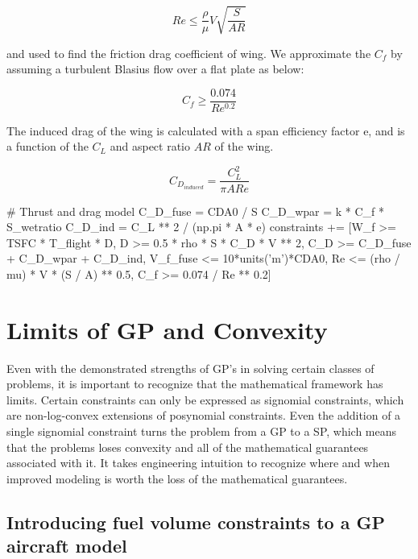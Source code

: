 \begin{equation}
    Re \leq \frac{\rho}{\mu} V \sqrt{\frac{S}{AR}}
\label{e:re}
\end{equation}

and used to find the friction drag coefficient of wing. We approximate the $C_f$ by assuming a turbulent Blasius flow over a flat plate as below:

\begin{equation}
    C_f \geq \frac{0.074} {Re^{0.2}}
\end{equation}

The induced drag of the wing is calculated with a span efficiency factor e, and is a function of the $C_L$ and aspect ratio $AR$ of the wing.

\begin{equation}
    C_{D_{induced}} = \frac{C_L^2}{\pi AR e}
\label{e:cdinduced}
\end{equation}

\begin{python}
        # Thrust and drag model
        C_D_fuse = CDA0 / S
        C_D_wpar = k * C_f * S_wetratio
        C_D_ind  = C_L ** 2 / (np.pi * A * e)
        constraints += [W_f >= TSFC * T_flight * D,
                    D >= 0.5 * rho * S * C_D * V ** 2,
                    C_D >= C_D_fuse + C_D_wpar + C_D_ind,
                    V_f_fuse <= 10*units('m')*CDA0,
                    Re <= (rho / mu) * V * (S / A) ** 0.5,
                    C_f >= 0.074 / Re ** 0.2]
\end{python}


\section{Limits of GP and Convexity} \label{sec:GPLimits}

Even with the demonstrated strengths of \gls{GP}'s in solving certain classes of 
problems, it is important to recognize that the mathematical framework has limits. 
Certain constraints can only be expressed as signomial constraints, which are 
non-log-convex extensions of posynomial constraints. Even the addition of a single 
signomial constraint turns the problem from a \gls{GP} to a \gls{SP}, which means 
that the problems loses convexity and all of the mathematical guarantees associated with it. 
It takes engineering intuition to recognize where and when improved modeling is worth
the loss of the mathematical guarantees.

\subsection{Introducing fuel volume constraints to a GP aircraft model}

